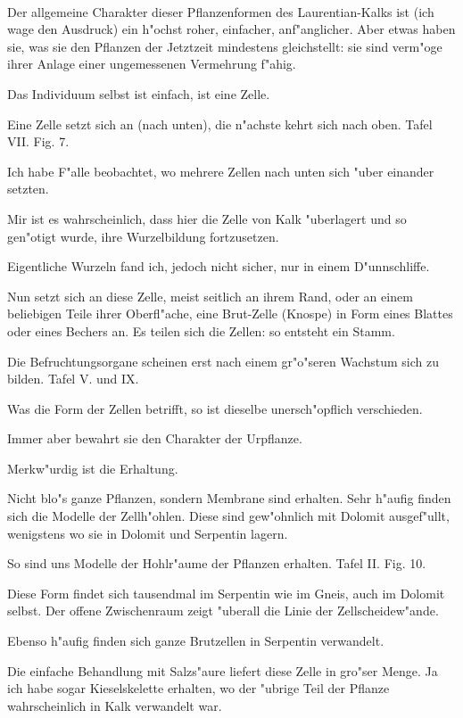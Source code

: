 \documentclass[a4paper, 11pt, oneside, german]{article}
\begin{document}
\paragraph{}
Der allgemeine Charakter dieser Pflanzenformen des Laurentian-Kalks ist (ich wage den Ausdruck) ein h"ochst roher, einfacher, anf"anglicher. Aber etwas haben sie, was sie den Pflanzen der Jetztzeit mindestens gleichstellt: sie sind verm"oge ihrer Anlage einer ungemessenen Vermehrung f"ahig.

Das Individuum selbst ist einfach, ist eine Zelle.

Eine Zelle setzt sich an (nach unten), die n"achste kehrt sich nach oben. Tafel VII. Fig. 7.

Ich habe F"alle beobachtet, wo mehrere Zellen nach unten sich "uber einander setzten.

Mir ist es wahrscheinlich, dass hier die Zelle von Kalk "uberlagert und so gen"otigt wurde, ihre Wurzelbildung fortzusetzen.

Eigentliche Wurzeln fand ich, jedoch nicht sicher, nur in einem D"unnschliffe.

Nun setzt sich an diese Zelle, meist seitlich an ihrem Rand, oder an einem beliebigen Teile ihrer Oberfl"ache, eine Brut-Zelle (Knospe) in Form eines Blattes oder eines Bechers an. Es teilen sich die Zellen: so entsteht ein Stamm.

Die Befruchtungsorgane scheinen erst nach einem gr"o"seren Wachstum sich zu bilden. Tafel V. und IX.

Was die Form der Zellen betrifft, so ist dieselbe unersch"opflich verschieden.

Immer aber bewahrt sie den Charakter der Urpflanze.

Merkw"urdig ist die Erhaltung.

Nicht blo"s ganze Pflanzen, sondern Membrane sind erhalten. Sehr h"aufig finden sich die Modelle der Zellh"ohlen. Diese sind gew"ohnlich mit Dolomit ausgef"ullt, wenigstens wo sie in Dolomit und Serpentin lagern.

So sind uns Modelle der Hohlr"aume der Pflanzen erhalten. Tafel II. Fig. 10.

Diese Form findet sich tausendmal im Serpentin wie im Gneis, auch im Dolomit selbst. Der offene Zwischenraum zeigt "uberall die Linie der Zellscheidew"ande.

Ebenso h"aufig finden sich ganze Brutzellen in Serpentin verwandelt.

Die einfache Behandlung mit Salzs"aure liefert diese Zelle in gro"ser Menge. Ja ich habe sogar Kieselskelette erhalten, wo der "ubrige Teil der Pflanze wahrscheinlich in Kalk verwandelt war.
\end{document}
